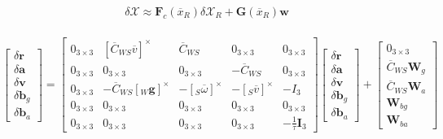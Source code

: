 \documentclass[a4paper,11pt,notitlepage]{article}
\begin{document}
\begin{equation}
\begin{aligned}
\delta \mathcal{X} \approx  \textbf{F}_{c} (\overline{x}_{R}) \delta \mathcal{X}_{R} + \textbf{G}(\overline{x}_{R})\textbf{w} \\
\end{aligned}
\end{equation}

\begin{equation}
\begin{bmatrix}
       \delta \textbf{\.r}  \\[0.3em]
       \delta \textbf{\.a} \\[0.3em]
       \delta \textbf{\.v} \\[0.3em]
       \delta \textbf{\.b}_{g} \\[0.3em]
       \delta \textbf{\.b}_{a}
\end{bmatrix}
=
\begin{bmatrix}
       0_{3 \times 3} &  [\overline{C}_{WS}\overline{v}]^{\times}
       & \overline{C}_{WS} &  0_{3 \times 3} &  0_{3 \times 3}\\
       
       0_{3 \times 3} & 0_{3 \times 3} 
       & 0_{3 \times 3} &  -\overline{C}_{WS} &  0_{3 \times 3}\\
       
       0_{3 \times 3} & -\overline{C}_{WS}[_{W}\textbf{g}]^{\times}
       & -[_{S}\overline{\omega}]^{\times} &  -[_{S}\overline{v}]^{\times} &  -I_{3}\\
       
       0_{3 \times 3} & 0_{3 \times 3}
       & 0_{3 \times 3} &  0_{3 \times 3} &  0_{3 \times 3}\\
       
       0_{3 \times 3} & 0_{3 \times 3} 
       & 0_{3 \times 3} &  0_{3 \times 3} &  -\frac{1}{\tau}\textbf{I}_{3}
\end{bmatrix}
\begin{bmatrix}
       \delta \textbf{r}  \\[0.3em]
       \delta \textbf{a} \\[0.3em]
       \delta \textbf{v} \\[0.3em]
       \delta \textbf{b}_{g} \\[0.3em]
       \delta \textbf{b}_{a}
\end{bmatrix}
+
\begin{bmatrix}
       0_{3 \times 3}  \\[0.3em]
       \overline{C}_{WS} \textbf{W}_{g} \\[0.3em]
       \overline{C}_{WS} \textbf{W}_{a} \\[0.3em]
       \textbf{W}_{bg} \\[0.3em]
       \textbf{W}_{ba}
\end{bmatrix}
\end{equation}
 
\end{document}
